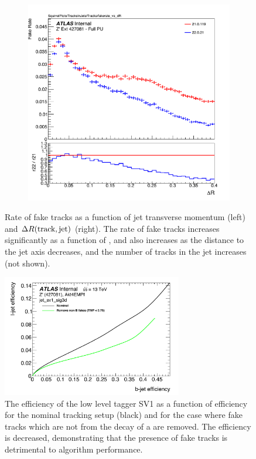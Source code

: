 \begin{figure}[!htbp]
\begin{subfigure}[b]{0.48\textwidth}
      \includegraphics[width=\textwidth]{chapters/track_classifier/figs/fakerate_vs_dr.pdf}
  \end{subfigure}
  \caption{
    Rate of fake tracks as a function of jet transverse momentum (left) and $\Delta R(\textnormal{track}, \textnormal{jet})$ (right).
    The rate of fake tracks increases significantly as a function of \pt, and also increases as the distance to the jet axis decreases, and the number of tracks in the jet increases (not shown).
  }
  \label{fig:fakerate_vs}
\end{figure}

\begin{figure}[!htbp]
    \centering
    \includegraphics[width=0.7\textwidth]{chapters/track_classifier/figs/sv1_perf_nofake.pdf}
    \caption{
      The \ljet efficiency of the low level tagger SV1 as a function of \bjet efficiency for the nominal tracking setup (black) and for the case where fake tracks which are not from the decay of a \bhadron are removed.
      The \ljet efficiency is decreased, demonstrating that the presence of fake tracks is detrimental to algorithm performance.
    }
    \label{fig:sv1_perf_nofake}
\end{figure}

